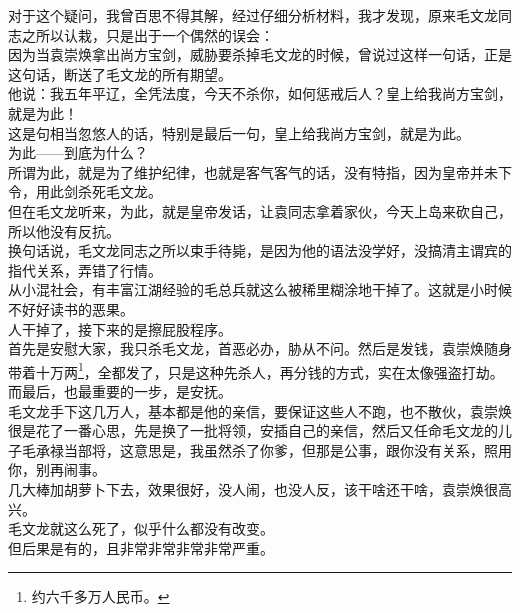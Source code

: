 \begin{multicols}{\theparacolNo}
对于这个疑问，我曾百思不得其解，经过仔细分析材料，我才发现，原来毛文龙同志之所以认栽，只是出于一个偶然的误会：\\

因为当袁崇焕拿出尚方宝剑，威胁要杀掉毛文龙的时候，曾说过这样一句话，正是这句话，断送了毛文龙的所有期望。\\

他说：我五年平辽，全凭法度，今天不杀你，如何惩戒后人？皇上给我尚方宝剑，就是为此！\\

这是句相当忽悠人的话，特别是最后一句，皇上给我尚方宝剑，就是为此。\\

为此——到底为什么？\\

所谓为此，就是为了维护纪律，也就是客气客气的话，没有特指，因为皇帝并未下令，用此剑杀死毛文龙。\\

但在毛文龙听来，为此，就是皇帝发话，让袁同志拿着家伙，今天上岛来砍自己，所以他没有反抗。\\

换句话说，毛文龙同志之所以束手待毙，是因为他的语法没学好，没搞清主谓宾的指代关系，弄错了行情。\\

从小混社会，有丰富江湖经验的毛总兵就这么被稀里糊涂地干掉了。这就是小时候不好好读书的恶果。\\

人干掉了，接下来的是擦屁股程序。\\

首先是安慰大家，我只杀毛文龙，首恶必办，胁从不问。然后是发钱，袁崇焕随身带着十万两\footnote{约六千多万人民币。}，全都发了，只是这种先杀人，再分钱的方式，实在太像强盗打劫。\\

而最后，也最重要的一步，是安抚。\\

毛文龙手下这几万人，基本都是他的亲信，要保证这些人不跑，也不散伙，袁崇焕很是花了一番心思，先是换了一批将领，安插自己的亲信，然后又任命毛文龙的儿子毛承禄当部将，这意思是，我虽然杀了你爹，但那是公事，跟你没有关系，照用你，别再闹事。\\

几大棒加胡萝卜下去，效果很好，没人闹，也没人反，该干啥还干啥，袁崇焕很高兴。\\

毛文龙就这么死了，似乎什么都没有改变。\\

但后果是有的，且非常非常非常非常严重。\\


\end{multicols}
